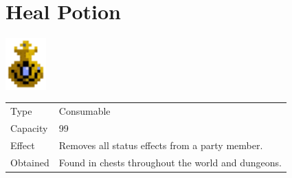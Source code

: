 \section{Heal Potion}
\label{item:heal_potion}

\includegraphics[height=2cm,keepaspectratio]{./resources/items/healpotion}

\begin{longtable}{ l p{9cm} }
	Type
	& Consumable
\\ %
	Capacity
	& 99
\\ %
	Effect
	& Removes all status effects from a party member.
\\ %
	Obtained
	& Found in chests throughout the world and dungeons.
\end{longtable}
